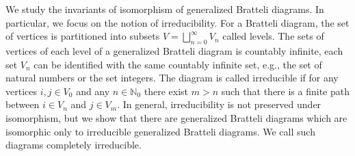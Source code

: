 \documentclass[11pt, twoside]{amsart}
\theoremstyle{definition}
\theoremstyle{remark}
\theoremstyle{plain}
\newcommand{\tcr}{\textcolor{red}}
\newcommand{\N}{\mathbb N}
\numberwithin{equation}{section}
\begin{document}
We study the invariants of isomorphism of generalized Bratteli diagrams.
In particular, we focus on the notion of irreducibility. For a Bratteli diagram, the set of vertices is partitioned into subsets $V = \bigsqcup_{n = 0}^{\infty} V_n$ called levels. The sets of vertices of each level of a generalized Bratteli diagram is countably infinite, each set $V_n$ can be identified with the same countably infinite set, e.g., the set of natural numbers or the set integers. 
The diagram is called irreducible if 
for any vertices $i, j \in V_0$ and any $n \in \N_0$ there exist 
$m 
> n$ such that there is a finite path between $i \in V_n$ and $j \in V_m$.
In general, irreducibility is not preserved under isomorphism, but we show that there are generalized Bratteli diagrams
which are isomorphic only to irreducible generalized Bratteli diagrams. We call such diagrams completely irreducible.
\end{document}
